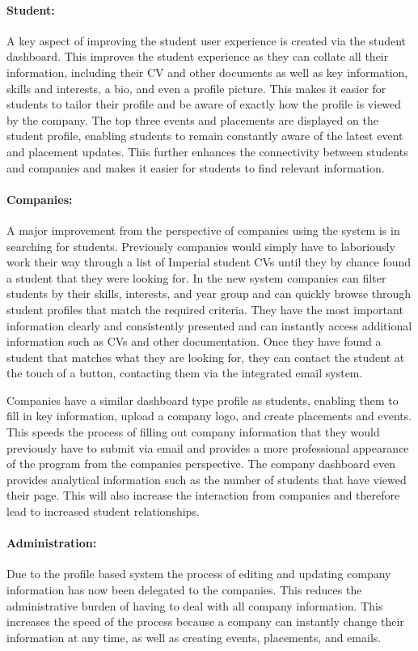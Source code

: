  \paragraph{Student:} 
 	A key aspect of improving the student user experience is created via the student dashboard. This improves the student experience as they can collate all their information, including their CV and other documents as well as key information, skills and interests, a bio, and even a profile picture. This makes it easier for students to tailor their profile and be aware of exactly how the profile is viewed by the company. The top three events and placements are displayed on the student profile, enabling students to remain constantly aware of the latest event and placement updates. This further enhances the connectivity between students and companies and makes it easier for students to find relevant information.

\paragraph{Companies:}
  A major improvement from the perspective of companies using the system is in searching for students. Previously companies would simply have to laboriously work their way through a list of Imperial student CVs until they by chance found a student that they were looking for. In the new system companies can filter students by their skills, interests, and year group and can quickly browse through student profiles that match the required criteria. They have the most important information clearly and consistently presented and can instantly access additional information such as CVs and other documentation. Once they have found a student that matches what they are looking for, they can contact the student at the touch of a button, contacting them via the integrated email system.

  Companies have a similar dashboard type profile as students, enabling them to fill in key information, upload a company logo, and create placements and events. This speeds the process of filling out company information that they would previously have to submit via email and provides a more professional appearance of the program from the companies perspective. The company dashboard even provides analytical information such as the number of students that have viewed their page. This will also increase the interaction from companies and therefore lead to increased student relationships.

\paragraph{Administration:}
  Due to the profile based system the process of editing and updating company information has now been delegated to the companies. This reduces the administrative burden of having to deal with all company information. This increases the speed of the process because a company can instantly change their information at any time, as well as creating events, placements, and emails.

